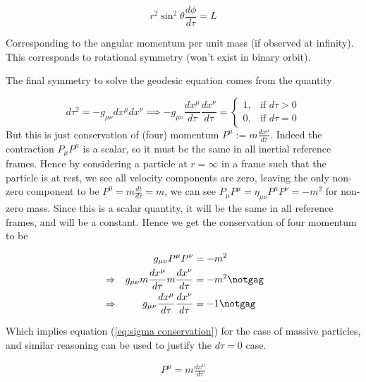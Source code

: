 \begin{equation}
    r^2 \sin^2\theta \frac{d\phi}{d\tau} = L
\end{equation}

Corresponding to the angular momentum per unit mass (if observed at infinity). This corresponds to rotational symmetry (won't exist in binary orbit).

The final symmetry to solve the geodesic equation comes from the quantity

\begin{equation}
    d\tau^2 = - g_{\mu \nu} dx^{\mu} dx^{\nu}\implies
    - g_{\mu \nu} \frac{dx^{\mu}}{d\tau} \frac{dx^{\nu}}{d\tau} = 
    \begin{cases}
        1,& \text{if } d\tau > 0\\
        0,              & \text{if } d\tau = 0
    \end{cases}
\end{equation}
But this is just conservation of (four) momentum $P^\mu:=m \frac{dx^\mu}{d\tau}$. Indeed the contraction $P_\mu P^\mu $ is a scalar, so it must be the same in all inertial reference frames. Hence by considering a particle at $r=\infty$ in a frame such that the particle is at rest, we see all velocity components are zero, leaving the only non-zero component to be $P^0=m \frac{dt}{d\tau}=m$, we can see $P_\mu P^\mu = \eta_{\mu \nu} P^\mu P^\nu = -m^2$ for non-zero mass. Since this is a scalar quantity, it will be the same in all reference frames, and will be a constant. Hence we get the conservation of four momentum to be

\begin{alignat}{2}
    &&g_{\mu \nu} P^\mu P^\nu &= -m^2 \\
    &\Rightarrow
    &g_{\mu \nu} m \frac{dx^\mu}{d\tau} m \frac{dx^\nu}{d\tau} &= -m^2 \notgag \\
    &\Rightarrow
    & g_{\mu \nu}  \frac{dx^\mu}{d\tau}  \frac{dx^\nu}{d\tau} &= -1 \notgag
\end{alignat}

Which implies equation (\ref{eq:sigma conservation}) for the case of massive particles, and similar reasoning can be used to justify the $d\tau=0$ case.

\begin{alignat}
    P^\mu = m \frac{dx^\mu}{d\tau}
    
\end{alignat}

